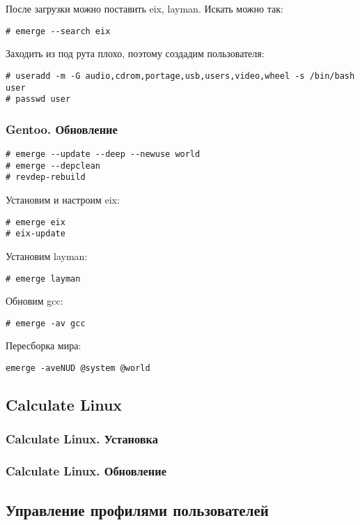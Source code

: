 \documentclass[12pt, a4paper]{article}
\begin{document}
После загрузки можно поставить eix, layman.
Искать можно так:
\begin{verbatim}
# emerge --search eix
\end{verbatim}

Заходить из под рута плохо, поэтому создадим пользователя:
\begin{verbatim}
# useradd -m -G audio,cdrom,portage,usb,users,video,wheel -s /bin/bash user
# passwd user
\end{verbatim}


\subsubsection{Gentoo. Обновление}

\begin{verbatim}
# emerge --update --deep --newuse world
# emerge --depclean
# revdep-rebuild
\end{verbatim}

Установим и настроим eix:
\begin{verbatim}
# emerge eix
# eix-update
\end{verbatim}

Установим layman:
\begin{verbatim}
# emerge layman
\end{verbatim}

Обновим gcc:
\begin{verbatim}
# emerge -av gcc
\end{verbatim}

Пересборка мира:
\begin{verbatim}
emerge -aveNUD @system @world
\end{verbatim}

\subsection{Calculate Linux}

\subsubsection{Calculate Linux. Установка}
\subsubsection{Calculate Linux. Обновление}

\subsection{Управление профилями пользователей}
\end{document}
